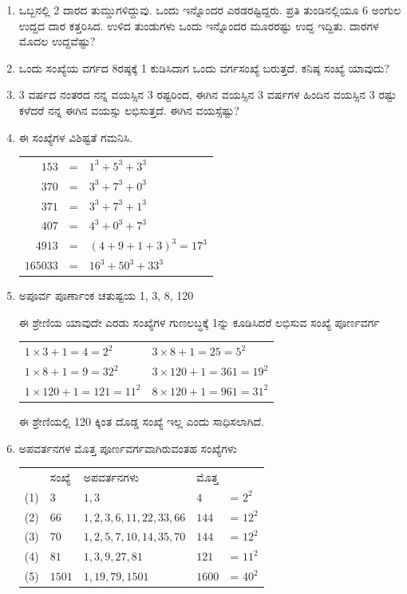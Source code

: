 \begin{enumerate}
\item ಒಬ್ಬನಲ್ಲಿ 2 ದಾರದ ತುಮ್ಡುಗಳಿದ್ದುವು. ಒಂದು ಇನ್ನೊಂದರ ಎರಡರಷ್ಟಿದ್ದರು. ಪ್ರತಿ ತುಂಡಿನಲ್ಲಿಯೂ 6 ಅಂಗುಲ ಉದ್ದದ ದಾರ ಕತ್ತರಿಸಿದ. ಉಳಿದ ತುಂಡುಗಳು ಒಂದು ಇನ್ನೊಂದರ ಮೂರರಷ್ಟು ಉದ್ದ ಇದ್ದಿತು. ದಾರಗಳ ಮೊದಲ ಉದ್ದವೆಷ್ಟು? 

\item ಒಂದು ಸಂಖ್ಯೆಯ ವರ್ಗದ 8ರಷ್ಠಕ್ಕೆ 1 ಕುಡಿಸಿದಾಗ ಒಂದು ವರ್ಗಸಂಖ್ಯೆ ಬರುತ್ತದೆ. ಕನಿಷ್ಠ ಸಂಖ್ಯೆ ಯಾವುದು? 

\item 3 ವರ್ಷದ ನಂತರದ ನನ್ನ ವಯಸ್ಸಿನ 3 ರಷ್ಟರಿಂದ, ಈಗಿನ ವಯಸ್ಸಿನ 3 ವರ್ಷಗಳ ಹಿಂದಿನ ವಯಸ್ಸಿನ 3 ರಷ್ಟು ಕಳೆದರೆ ನನ್ನ ಈಗಿನ ವಯಸ್ಸು ಲಭಿಸುತ್ತದೆ. ಈಗಿನ ವಯಸ್ಸೆಷ್ಟು? 

\item ಈ ಸಂಖ್ಯೆಗಳ ವಿಶಿಷ್ಟತೆ ಗಮನಿಸಿ. 

\begin{tabular}[t]{rcl}
$153$ & = & $1^{3} + 5^{3} + 3^{3}$\\
$370$ & = & $3^{3} + 7^{3} + 0^{3}$\\
$371$ & = & $3^{3} + 7^{3} + 1^{3}$\\
$407$ & = & $4^{3} + 0^{3} + 7^{3}$\\
$4913$ & = & $(4 + 9 + 1 + 3)^{3} = 17^{3}$\\
$165033$ & = & $16^{3} + 50^{3} + 33^{3}$
\end{tabular}

\item ಅಪೂರ್ವ ಪೂರ್ಣಾಂಕ ಚತುಷ್ಟಯ 1, 3, 8, 120

ಈ ಶ್ರೇಣಿಯ ಯಾವುದೇ ಎರಡು ಸಂಖ್ಯೆಗಳ ಗುಣಲಬ್ಧಕ್ಕೆ 1ನ್ನು ಕೂಡಿಸಿದರೆ ಲಭಿಸುವ ಸಂಖ್ಯೆ ಪೂರ್ಣವರ್ಗ 

\begin{tabular}[t]{ll}
$1 \times 3 + 1 = 4 = 2^{2}$ & $3\times 8 + 1 = 25 = 5^{2}$\\
$1 \times 8 + 1 = 9 =32^{2}$ & $3\times 120 + 1 = 361 = 19^{2}$\\
$1 \times 120 + 1 = 121 = 11^{2}$ & $8\times 120 + 1 = 961 = 31^{2}$\\
\end{tabular}

ಈ ಶ್ರೇಣಿಯಲ್ಲಿ 120 ಕ್ಕಿಂತ ದೊಡ್ಡ ಸಂಖ್ಯೆ ಇಲ್ಲ ಎಂದು ಸಾಧಿಸಲಾಗಿದೆ. 

\item ಅಪವರ್ತನಗಳ ಮೊತ್ತ ಪೂರ್ಣವರ್ಗವಾಗಿರುವಂತಹ ಸಂಖ್ಯೆಗಳು 

\begin{tabular}[t]{lllll}
 & ಸಂಖ್ಯೆ & ಅಪವರ್ತನಗಳು & ಮೊತ್ತ & \\
 (1) & $3$ & $1, 3$ & $4$ & = $2^{2}$\\
 (2) & $66$ & $1, 2, 3, 6, 11, 22, 33, 66$ & $144$ & = $12^{2}$\\
 (3) & $70$ & $1, 2, 5, 7, 10, 14, 35, 70$ & $144$ & = $12^{2}$\\
 (4) & $81$ & $1, 3, 9, 27, 81$ & $121$ & = $11^{2}$\\
 (5) & $1501$ & $1, 19, 79, 1501$ & $1600$ & = $40^{2}$
\end{tabular}
\end{enumerate}

